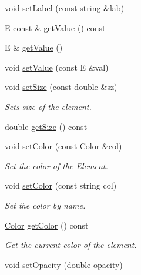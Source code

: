 \begin{DoxyCompactItemize}
\item 
void \hyperlink{classbridges_1_1datastructure_1_1_element_a3a1fe4e3aa100125710c30f6e401e8c3}{set\+Label} (const string \&lab)
\item 
E const  \& \hyperlink{classbridges_1_1datastructure_1_1_element_acf6e068c6b00ff0d20ed42af32ff1f38}{get\+Value} () const
\item 
E \& \hyperlink{classbridges_1_1datastructure_1_1_element_abba0b4c03eb6fd08aed17eeb3be5bd1b}{get\+Value} ()
\item 
void \hyperlink{classbridges_1_1datastructure_1_1_element_a26f2aceb9eed7195fd55b3538f3c059f}{set\+Value} (const E \&val)
\item 
void \hyperlink{classbridges_1_1datastructure_1_1_element_a3200b0ac712c1720db62d1f0bbcb14be}{set\+Size} (const double \&sz)
\begin{DoxyCompactList}\small\item\em Sets size of the element. \end{DoxyCompactList}\item 
double \hyperlink{classbridges_1_1datastructure_1_1_element_a8c0b15450978b03c8ebf6a3c23092cba}{get\+Size} () const
\item 
void \hyperlink{classbridges_1_1datastructure_1_1_element_a17d75aae50a48b3404f3c6811c62ae1c}{set\+Color} (const \hyperlink{classbridges_1_1datastructure_1_1_color}{Color} \&col)
\begin{DoxyCompactList}\small\item\em Set the color of the \hyperlink{classbridges_1_1datastructure_1_1_element}{Element}. \end{DoxyCompactList}\item 
void \hyperlink{classbridges_1_1datastructure_1_1_element_a3792c8d514f4d644d739c6124f26bcbf}{set\+Color} (const string col)
\begin{DoxyCompactList}\small\item\em Set the color by name. \end{DoxyCompactList}\item 
\hyperlink{classbridges_1_1datastructure_1_1_color}{Color} \hyperlink{classbridges_1_1datastructure_1_1_element_adf441bce0ef9e4abd36c1df00ea5932c}{get\+Color} () const
\begin{DoxyCompactList}\small\item\em Get the current color of the element. \end{DoxyCompactList}\item 
void \hyperlink{classbridges_1_1datastructure_1_1_element_acb5d0b5734a6b3c17b7b1784ae1dc79c}{set\+Opacity} (double opacity)

\end{DoxyCompactItemize}
